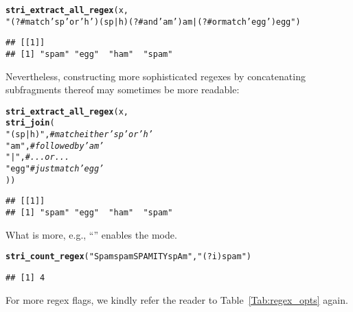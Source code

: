 \documentclass[nojss]{jss}\usepackage[]{graphicx}\usepackage[]{xcolor}
\makeatletter
\newcommand{\hlstr}[1]{\textcolor[rgb]{0.192,0.494,0.8}{#1}}%
\newcommand{\hlcom}[1]{\textcolor[rgb]{0.678,0.584,0.686}{\textit{#1}}}%
\newcommand{\hlstd}[1]{\textcolor[rgb]{0.345,0.345,0.345}{#1}}%
\newcommand{\hlkwd}[1]{\textcolor[rgb]{0.737,0.353,0.396}{\textbf{#1}}}%
\newenvironment{kframe}{%
 \def\at@end@of@kframe{}%
 \ifinner\ifhmode%
  \def\at@end@of@kframe{\end{minipage}}%
  \begin{minipage}{\columnwidth}%
 \fi\fi%
 \def\FrameCommand##1{\hskip\@totalleftmargin \hskip-\fboxsep
 \colorbox{shadecolor}{##1}\hskip-\fboxsep
     \hskip-\linewidth \hskip-\@totalleftmargin \hskip\columnwidth}%
 \MakeFramed {\advance\hsize-\width
   \@totalleftmargin\z@ \linewidth\hsize
   \@setminipage}}%
 {\par\unskip\endMakeFramed%
 \at@end@of@kframe}
\newenvironment{knitrout}{}{} %
\makeatother
\begin{document}
\begin{knitrout}
\color{fgcolor}\begin{kframe}
\begin{alltt}
\hlkwd{stri_extract_all_regex}\hlstd{(x,}
  \hlstr{"(?# match 'sp' or 'h')(sp|h)(?# and 'am')am|(?# or match 'egg')egg"}\hlstd{)}
\end{alltt}
\begin{verbatim}
## [[1]]
## [1] "spam" "egg"  "ham"  "spam"
\end{verbatim}
\end{kframe}
\end{knitrout}

\noindent
Nevertheless, constructing more sophisticated regexes by concatenating
subfragments thereof may sometimes be more readable:

\begin{knitrout}
\color{fgcolor}\begin{kframe}
\begin{alltt}
\hlkwd{stri_extract_all_regex}\hlstd{(x,}
  \hlkwd{stri_join}\hlstd{(}
      \hlstr{"(sp|h)"}\hlstd{,}   \hlcom{# match either 'sp' or 'h'}
      \hlstr{"am"}\hlstd{,}       \hlcom{# followed by 'am'}
    \hlstr{"|"}\hlstd{,}            \hlcom{# ... or ...}
      \hlstr{"egg"}       \hlcom{# just match 'egg'}
\hlstd{))}
\end{alltt}
\begin{verbatim}
## [[1]]
## [1] "spam" "egg"  "ham"  "spam"
\end{verbatim}
\end{kframe}
\end{knitrout}


What is more, e.g., ``'' enables the 
mode.

\begin{knitrout}
\color{fgcolor}\begin{kframe}
\begin{alltt}
\hlkwd{stri_count_regex}\hlstd{(}\hlstr{"Spam spam SPAMITY spAm"}\hlstd{,} \hlstr{"(?i)spam"}\hlstd{)}
\end{alltt}
\begin{verbatim}
## [1] 4
\end{verbatim}
\end{kframe}
\end{knitrout}

For more regex flags, we kindly refer the reader to Table~\ref{Tab:regex_opts} again.
\end{document}
